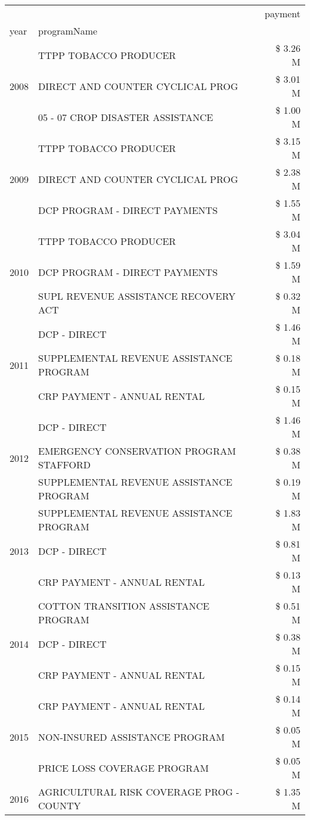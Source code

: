\begin{tabular}{llr}
\toprule
 &  & payment \\
year & programName &  \\
\midrule
\multirow[t]{3}{*}{2008} & TTPP TOBACCO PRODUCER & \$ 3.26 M \\
 & DIRECT AND COUNTER CYCLICAL PROG & \$ 3.01 M \\
 & 05 - 07 CROP DISASTER ASSISTANCE & \$ 1.00 M \\
\cline{1-3}
\multirow[t]{3}{*}{2009} & TTPP TOBACCO PRODUCER & \$ 3.15 M \\
 & DIRECT AND COUNTER CYCLICAL PROG & \$ 2.38 M \\
 & DCP PROGRAM - DIRECT PAYMENTS & \$ 1.55 M \\
\cline{1-3}
\multirow[t]{3}{*}{2010} & TTPP TOBACCO PRODUCER & \$ 3.04 M \\
 & DCP PROGRAM - DIRECT PAYMENTS & \$ 1.59 M \\
 & SUPL REVENUE ASSISTANCE RECOVERY ACT & \$ 0.32 M \\
\cline{1-3}
\multirow[t]{3}{*}{2011} & DCP - DIRECT & \$ 1.46 M \\
 & SUPPLEMENTAL REVENUE ASSISTANCE PROGRAM & \$ 0.18 M \\
 & CRP PAYMENT - ANNUAL RENTAL & \$ 0.15 M \\
\cline{1-3}
\multirow[t]{3}{*}{2012} & DCP - DIRECT & \$ 1.46 M \\
 & EMERGENCY CONSERVATION PROGRAM STAFFORD & \$ 0.38 M \\
 & SUPPLEMENTAL REVENUE ASSISTANCE PROGRAM & \$ 0.19 M \\
\cline{1-3}
\multirow[t]{3}{*}{2013} & SUPPLEMENTAL REVENUE ASSISTANCE PROGRAM & \$ 1.83 M \\
 & DCP - DIRECT & \$ 0.81 M \\
 & CRP PAYMENT - ANNUAL RENTAL & \$ 0.13 M \\
\cline{1-3}
\multirow[t]{3}{*}{2014} & COTTON TRANSITION ASSISTANCE PROGRAM & \$ 0.51 M \\
 & DCP - DIRECT & \$ 0.38 M \\
 & CRP PAYMENT - ANNUAL RENTAL & \$ 0.15 M \\
\cline{1-3}
\multirow[t]{3}{*}{2015} & CRP PAYMENT - ANNUAL RENTAL & \$ 0.14 M \\
 & NON-INSURED ASSISTANCE PROGRAM & \$ 0.05 M \\
 & PRICE LOSS COVERAGE PROGRAM & \$ 0.05 M \\
\cline{1-3}
\multirow[t]{3}{*}{2016} & AGRICULTURAL RISK COVERAGE PROG - COUNTY & \$ 1.35 M \\

\end{tabular}
